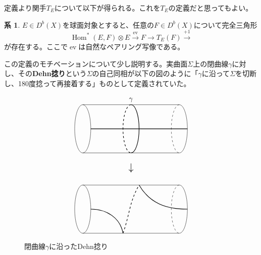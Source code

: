 \documentclass[uplatex,11pt,a4paper,dvipdfmx]{jsarticle}
\numberwithin{equation}{section}
\theoremstyle{definition}
\newtheorem{corollary}[theorem]{系}
\DeclareMathOperator{\Hom}{\mathrm{Hom}}
\DeclareMathOperator{\ev}{\mathrm{ev}}
\begin{document}
定義より関手$T_E$について以下が得られる。これを$T_E$の定義だと思ってもよい。
\begin{corollary}
    $E \in D^b(X)$を球面対象とすると、任意の$F \in D^b(X)$について完全三角形
    \begin{equation}\label{eq:twist}
        \Hom^*(E, F) \otimes E \xrightarrow{\ev} F \to T_E (F) \xrightarrow{+1}
    \end{equation}
    が存在する。ここで$\ev$は自然なペアリング写像である。
\end{corollary}
この定義のモチベーションについて少し説明する。実曲面$\Sigma$上の閉曲線$\gamma$に対し、その\textbf{Dehn捻り}という$\Sigma$の自己同相が以下の図のように「$\gamma$に沿って$\Sigma$を切断し、180度捻って再接着する」ものとして定義されていた。

\begin{figure}[h]
    \centering
    \begin{displaymath}
        \begin{tikzpicture}[scale=0.8]
            \draw (0,0+5)--(6,0+5);
            \draw (0,3+5)--(6,3+5);

            \draw[thick] (0.5, 1.5+5)--(6.5, 1.5+5);

            \draw (0, 1.5+5) circle[x radius=0.5, y radius=1.5];

            \draw(6, 0+5)arc(-90:90:0.5 and 1.5);
            \draw[dashed](6, 3+5)arc(90:270:0.5 and 1.5);

            \draw[thick](3, 0+5)arc(-90:90:0.5 and 1.5);
            \draw[thick, dashed](3, 3+5)arc(90:270:0.5 and 1.5);


            \draw(3, 3+5) node[above]{$\gamma$};

            \draw(3, -0.5+5) node[below]{\Large$\downarrow$};


            \draw (0,0)--(6,0);
            \draw (0,3)--(6,3);

            \draw (0, 1.5) circle[x radius=0.5, y radius=1.5];

            \draw(6, 0)arc(-90:90:0.5 and 1.5);
            \draw[dashed](6, 3)arc(90:270:0.5 and 1.5);

            \draw[thick](0.5, 1.5) to[out=0,in=100](2.5, 0);
            \draw[thick, dashed](2.5, 0) to[out=70,in=-120](3.5, 3);
            \draw[thick](3.5, 3) to[out=-60,in=180](6.5, 1.5);
        \end{tikzpicture}
    \end{displaymath}
    \caption{閉曲線$\gamma$に沿ったDehn捻り}
    \label{Dehn_twist}
\end{figure}
\end{document}
